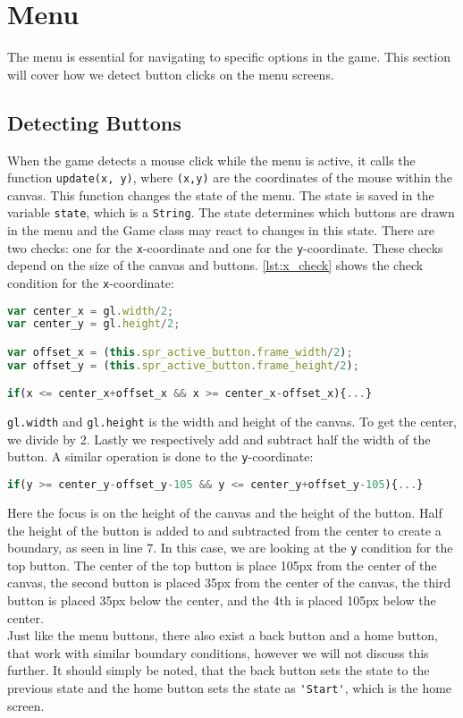 \section{Menu}
\label{sec:imp_menu}

The menu is essential for navigating to specific options in the game. This section will cover how we detect button clicks on the menu screens.

\subsection{Detecting Buttons}

When the game detects a mouse click while the menu is active, it calls the function \texttt{update(x, y)}, where \texttt{(x,y)} are the coordinates of the mouse within the canvas. This function changes the state of the menu. The state is saved in the variable \verb|state|, which is a \verb|String|. The state determines which buttons are drawn in the menu and the Game class may react to changes in this state. There are two checks: one for the \texttt{x}-coordinate and one for the \texttt{y}-coordinate. These checks depend on the size of the canvas and buttons. \autoref{lst:x_check} shows the check condition for the \texttt{x}-coordinate:

\begin{lstlisting}[language=JavaScript, caption=x condition check for menu buttons, label=lst:x_check]
var center_x = gl.width/2;
var center_y = gl.height/2;

var offset_x = (this.spr_active_button.frame_width/2);
var offset_y = (this.spr_active_button.frame_height/2);

if(x <= center_x+offset_x && x >= center_x-offset_x){...}
\end{lstlisting}

\verb|gl.width| and \verb|gl.height| is the width and height of the canvas. To get the center, we divide by 2. Lastly we respectively add and subtract half the width of the button. A similar operation is done to the \texttt{y}-coordinate:

\begin{lstlisting}[language=JavaScript, caption=y condition check for menu buttons]
if(y >= center_y-offset_y-105 && y <= center_y+offset_y-105){...}
\end{lstlisting}

Here the focus is on the height of the canvas and the height of the button. Half the height of the button is added to and subtracted from the center to create a boundary, as seen in line 7. In this case, we are looking at the \texttt{y} condition for the top button. The center of the top button is place 105px from the center of the canvas, the second button is placed 35px from the center of the canvas, the third button is placed 35px below the center, and the 4th is placed 105px below the center.\\

Just like the menu buttons, there also exist a back button and a home button, that work with similar boundary conditions, however we will not discuss this further. It should simply be noted, that the back button sets the state to the previous state and the home button sets the state as \verb|'Start'|, which is the home screen.
